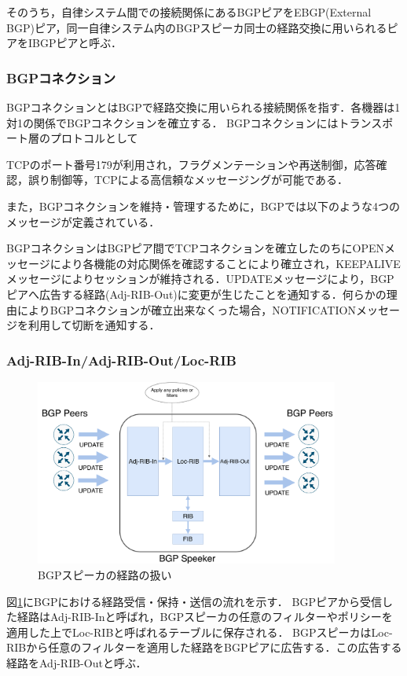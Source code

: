 そのうち，自律システム間での接続関係にあるBGPピアをEBGP(External BGP)ピア，同一自律システム内のBGPスピーカ同士の経路交換に用いられるピアをIBGPピアと呼ぶ．

\subsubsection{BGPコネクション}
BGPコネクションとはBGPで経路交換に用いられる接続関係を指す．各機器は1対1の関係でBGPコネクションを確立する．
BGPコネクションにはトランスポート層のプロトコルとして{TCP\cite{RFC793}のポート番号179が利用され，フラグメンテーションや再送制御，応答確認，誤り制御等，TCPによる高信頼なメッセージングが可能である．

また，BGPコネクションを維持・管理するために，BGPでは以下のような4つのメッセージが定義されている．

BGPコネクションはBGPピア間でTCPコネクションを確立したのちにOPENメッセージにより各機能の対応関係を確認することにより確立され，KEEPALIVEメッセージによりセッションが維持される．UPDATEメッセージにより，BGPピアへ広告する経路(Adj-RIB-Out)に変更が生じたことを通知する．何らかの理由によりBGPコネクションが確立出来なくった場合，NOTIFICATIONメッセージを利用して切断を通知する．

\subsubsection{Adj-RIB-In/Adj-RIB-Out/Loc-RIB}
\begin{figure}[h]
    \begin{center}
    \includegraphics[width=10cm,pagebox=cropbox,clip]{img/bgp-rib-model.pdf}
    \end{center}
    \caption{BGPスピーカの経路の扱い}
    \label{fig:bgp-rib-model}
\end{figure}
図\ref{fig:bgp-rib-model}にBGPにおける経路受信・保持・送信の流れを示す．
BGPピアから受信した経路はAdj-RIB-Inと呼ばれ，BGPスピーカの任意のフィルターやポリシーを適用した上でLoc-RIBと呼ばれるテーブルに保存される．
BGPスピーカはLoc-RIBから任意のフィルターを適用した経路をBGPピアに広告する．この広告する経路をAdj-RIB-Outと呼ぶ．




}
